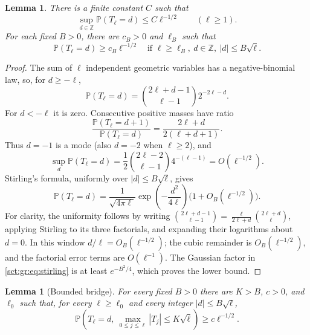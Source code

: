 \documentclass[11pt,letterpaper]{article}
\newtheorem{lemma}[theorem]{Lemma}
\theoremstyle{definition}\newtheorem{remark}[theorem]{Remark}
\newcommand{\Pp}{\mathbb P}\newcommand{\Ee}{\mathbb E}
\newcommand{\Z}{\mathbb Z}\newcommand{\R}{\mathbb R}\newcommand{\NN}{\mathbb N}
\begin{document}
\begin{lemma}\label{sct:gr:lem:atoms}
There is a finite constant $C$ such that
\[
 \sup_{d\in\Z}\Pp(T_\ell=d)\le C\ell^{-1/2}\qquad(\ell\ge1).
\]
For each fixed $B>0$, there are $c_B>0$ and $\ell_B$ such that
\[
 \Pp(T_\ell=d)\ge c_B\ell^{-1/2}
 \quad\text{if }\ell\ge\ell_B,\ d\in\Z,\ |d|\le B\sqrt\ell.
\]
\end{lemma}

\begin{proof}
The sum of $\ell$ independent geometric variables has a negative-binomial
law, so, for $d\ge-\ell$,
\begin{equation}\label{sct:gr:eq:nb}
 \Pp(T_\ell=d)=\binom{2\ell+d-1}{\ell-1}2^{-2\ell-d}.
\end{equation}
For $d<-\ell$ it is zero. Consecutive positive masses have ratio
\[
 \frac{\Pp(T_\ell=d+1)}{\Pp(T_\ell=d)}
 =\frac{2\ell+d}{2(\ell+d+1)}.
\]
Thus $d=-1$ is a mode (also $d=-2$ when $\ell\ge2$), and
\[
 \sup_d\Pp(T_\ell=d)
 =\frac12\binom{2\ell-2}{\ell-1}4^{-(\ell-1)}
 =O(\ell^{-1/2}).
\]
Stirling's formula, uniformly over $|d|\le B\sqrt\ell$, gives
\begin{equation}\label{sct:gr:eq:stirling}
 \Pp(T_\ell=d)=\frac{1}{\sqrt{4\pi\ell}}
 \exp\!\left(-\frac{d^2}{4\ell}\right)
 \bigl(1+O_B(\ell^{-1/2})\bigr).
\end{equation}
For clarity, the uniformity follows by writing
$\binom{2\ell+d-1}{\ell-1}=\frac{\ell}{2\ell+d}\binom{2\ell+d}{\ell}$,
applying Stirling to its three factorials, and expanding their logarithms
about $d=0$. In this window $d/\ell=O_B(\ell^{-1/2})$; the cubic remainder is
$O_B(\ell^{-1/2})$, and the factorial error terms are $O(\ell^{-1})$.
The Gaussian factor in \eqref{sct:gr:eq:stirling} is at least $e^{-B^2/4}$, which
proves the lower bound.
\end{proof}

\begin{lemma}[Bounded bridge]\label{sct:gr:lem:bridge}
For every fixed $B>0$ there are $K>B$, $c>0$, and $\ell_0$ such that,
for every $\ell\ge\ell_0$ and every integer $|d|\le B\sqrt\ell$,
\begin{equation}\label{sct:gr:eq:bridge}
 \Pp\!\left(T_\ell=d,\ \max_{0\le j\le\ell}|T_j|\le K\sqrt\ell\right)
 \ge c\ell^{-1/2}.
\end{equation}
\end{lemma}
\end{document}
